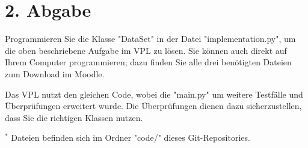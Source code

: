 \documentclass[a4paper,12pt]{article}
\begin{document}
\section{2. Abgabe}
\justify
Programmieren Sie die Klasse "DataSet" in der Datei "implementation.py", um die oben beschriebene Aufgabe im VPL zu lösen. Sie können auch direkt auf Ihrem Computer programmieren; dazu finden Sie alle drei benötigten Dateien zum Download im Moodle.

Das VPL nutzt den gleichen Code, wobei die "main.py" um weitere Testfälle und Überprüfungen erweitert wurde. Die Überprüfungen dienen dazu sicherzustellen, dass Sie die richtigen Klassen nutzen.

\vspace{1cm}
\hrulefill
\vspace{0.5cm}
\footnotesize $^*$ Dateien befinden sich im Ordner "code/" dieses Git-Repositories.
\end{document}
